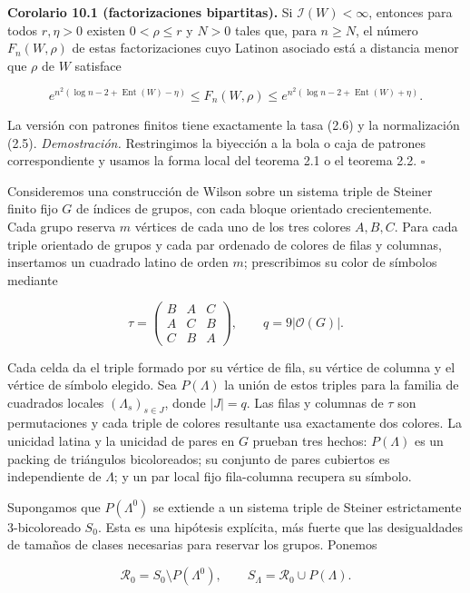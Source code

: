 \documentclass[spanish,11pt,a4paper]{article}
\begin{document}
\textbf{Corolario 10.1 (factorizaciones bipartitas).} Si \(\mathcal I(W)<\infty\), entonces para todos \(r,\eta>0\) existen \(0<\rho\le r\) y \(N>0\) tales que, para \(n\ge N\), el número \(F_n(W,\rho)\) de estas factorizaciones cuyo Latinon asociado está a distancia menor que \(\rho\) de \(W\) satisface

\nopagebreak[4]
\[e^{n^2(\log n-2+\operatorname{Ent}(W)-\eta)}\le F_n(W,\rho)
\le e^{n^2(\log n-2+\operatorname{Ent}(W)+\eta)}.\tag{10.1}\]

La versión con patrones finitos tiene exactamente la tasa (2.6) y la normalización (2.5). \emph{Demostración.} Restringimos la biyección a la bola o caja de patrones correspondiente y usamos la forma local del teorema 2.1 o el teorema 2.2. \(\square\)

Consideremos una construcción de Wilson sobre un sistema triple de Steiner finito fijo \(G\) de índices de grupos, con cada bloque orientado crecientemente. Cada grupo reserva \(m\) vértices de cada uno de los tres colores \(A,B,C\). Para cada triple orientado de grupos y cada par ordenado de colores de filas y columnas, insertamos un cuadrado latino de orden \(m\); prescribimos su color de símbolos mediante

\nopagebreak[4]
\[\tau=\begin{pmatrix}B&A&C\\A&C&B\\C&B&A\end{pmatrix},\qquad
q=9|\mathcal O(G)|.\tag{10.2}\]

Cada celda da el triple formado por su vértice de fila, su vértice de columna y el vértice de símbolo elegido. Sea \(P(\Lambda)\) la unión de estos triples para la familia de cuadrados locales \((\Lambda_s)_{s\in J}\), donde \(|J|=q\). Las filas y columnas de \(\tau\) son permutaciones y cada triple de colores resultante usa exactamente dos colores. La unicidad latina y la unicidad de pares en \(G\) prueban tres hechos: \(P(\Lambda)\) es un packing de triángulos bicoloreados; su conjunto de pares cubiertos es independiente de \(\Lambda\); y un par local fijo fila-columna recupera su símbolo.

Supongamos que \(P(\Lambda^0)\) se extiende a un sistema triple de Steiner estrictamente 3-bicoloreado \(S_0\). Esta es una hipótesis explícita, más fuerte que las desigualdades de tamaños de clases necesarias para reservar los grupos. Ponemos

\nopagebreak[4]
\[\mathcal R_0=S_0\setminus P(\Lambda^0),\qquad S_\Lambda=\mathcal R_0\cup P(\Lambda).\tag{10.3}\]
\end{document}
